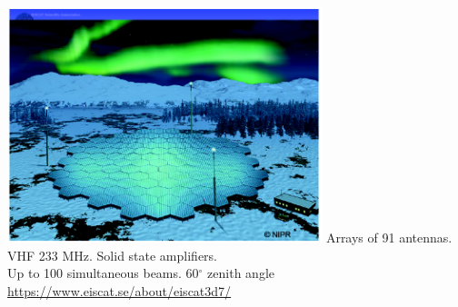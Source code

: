 \begin{frame}[fragile,t]
\frametitle{\hfill}
\vspace{0.1in}
\begin{center}
\includegraphics[height=2.7in]{eiscat_3d_array.png}
\vfill
    { Arrays of 91 antennas. VHF 233 MHz. Solid state amplifiers.\\Up to 100 simultaneous beams. 60$^\circ$ zenith angle}
    {\colblack \small \url{https://www.eiscat.se/about/eiscat3d7/}}
\end{center}
\end{frame}

